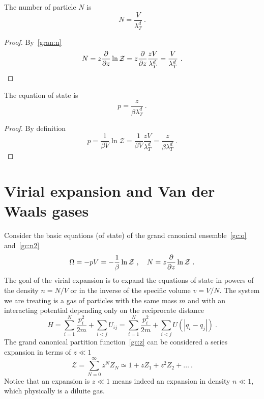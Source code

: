     The number of particle $N$ is 
    \begin{equation*}
        N = \frac{V}{\lambda_T^d} ~.
    \end{equation*}
    \begin{proof}
        By~\eqref{gran:n}
        \begin{equation*}
            N = z \frac{\partial}{\partial z} \ln \mathcal Z = z \frac{\partial}{\partial z} \frac{z V}{\lambda_T^d} = \frac{V}{\lambda_T^d} ~.
        \end{equation*}
    \end{proof}
    
    The equation of state is 
    \begin{equation*}
        p = \frac{z}{\beta \lambda_T^d} ~.
    \end{equation*}
    \begin{proof}
        By definition
        \begin{equation*}
            p = \frac{1}{\beta V} \ln \mathcal Z = \frac{1}{\beta V} \frac{z V}{\lambda_T^d} = \frac{z}{\beta \lambda_T^d} ~.
        \end{equation*}
    \end{proof}

\section{Virial expansion and Van der Waals gases} 

    Consider the basic equations (of state) of the grand canonical ensemble~\eqref{gc:o} and~\eqref{gc:n2} 
    \begin{equation}\label{gc:es}
        \Omega = - pV = - \frac{1}{\beta} \ln \mathcal Z~, \quad N = z \frac{\partial}{\partial z} \ln \mathcal Z ~.
    \end{equation}
    The goal of the virial expansion is to expand the equations of state in powers of the density $n = N/V$ or in the inverse of the specific volume $v = V / N$. The system we are treating is a gas of particles with the same mass $m$ and with an interacting potential depending only on the reciprocate distance 
    \begin{equation*}
        H = \sum_{i=1}^N \frac{p_i^2}{2m} + \sum_{i < j} U_{ij} = \sum_{i=1}^N \frac{p_i^2}{2m} + \sum_{i < j} U (|q_i - q_j|) ~.
    \end{equation*}
    The grand canonical partition function~\eqref{gc:z} can be considered a series expansion in terms of $z \ll 1$ 
    \begin{equation*}
        \mathcal Z = \sum_{N=0}^\infty z^N Z_N \simeq 1 + z Z_1 + z^2 Z_2 + \ldots ~.
    \end{equation*}
    Notice that an expansion is $z \ll 1$ means indeed an expansion in density $n \ll 1$, which physically is a diluite gas.

